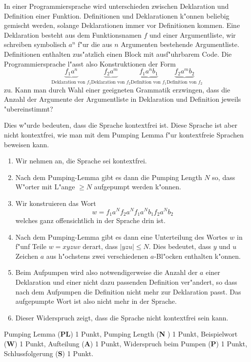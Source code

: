 In einer Programmiersprache wird unterschieden zwischen Deklaration
und Definition einer Funktion.
Definitionen und Deklarationen k"onnen beliebig gemischt werden,
solange Deklarationen immer vor Definitionen kommen.
Eine Deklaration besteht aus dem Funktionsnamen $f$ und einer Argumentliste,
wir schreiben symbolisch $a^n$  f"ur die aus $n$ Argumenten bestehende
Argumentliste.
Definitionen enthalten zus"atzlich einen Block mit ausf"uhrbarem Code.
Die Programmiersprache l"asst also Konstruktionen der Form
\[
\underbrace{f_1a^n}_{\text{Deklaration von $f_1$}}
\underbrace{f_2a^m}_{\text{Deklaration von $f_2$}}
\underbrace{f_1a^nb_1}_{\text{Definition von $f_1$}}
\underbrace{f_2a^m b_2}_{\text{Definition von $f_2$}}
\]
zu.
Kann man durch Wahl einer geeigneten Grammatik erzwingen, dass die
Anzahl der Argumente der Argumentliste in Deklaration und Definition
jeweils "ubereinstimmt?

\begin{loesung}
Dies w"urde bedeuten, dass die Sprache kontextfrei ist.
Diese Sprache ist aber nicht kontextfrei, wie man mit dem Pumping Lemma
f"ur kontextfreie Sprachen beweisen kann.
\begin{enumerate}
\item
Wir nehmen an, die Sprache sei kontextfrei.
\item
Nach dem Pumping-Lemma gibt es dann die Pumping Length $N$ so,
dass W"orter mit L"ange $\ge N$ aufgepumpt werden k"onnen.
\item
Wir konstruieren das Wort
\[
w=f_1a^N f_2a^N f_1a^Nb_1f_2a^Nb_2
\]
welches ganz offensichtlich in der Sprache drin ist.
\item
Nach dem Pumping-Lemma gibt es dann eine Unterteilung des Wortes $w$ in
f"unf Teile $w=xyzuv$ derart, dass $|yzu|\le N$.
Dies bedeutet, dass $y$ und $u$ Zeichen $a$ aus h"ochstens zwei verschiedenen
$a$-Bl"ocken enthalten k"onnen.
\item
Beim Aufpumpen wird also notwendigerweise die Anzahl der $a$ einer
Deklaration und einer nicht dazu passenden Definition ver"andert,
so dass nach dem Aufpumpen die Definition nicht mehr zur Deklaration 
passt.
Das aufgepumpte Wort ist also nicht mehr in der Sprache.
\item
Dieser Widerspruch zeigt, dass die Sprache nicht kontextfrei sein kann.
\qedhere
\end{enumerate}
\end{loesung}

\begin{bewertung}
Pumping Lemma ({\bf PL}) 1 Punkt,
Pumping Length ({\bf N }) 1 Punkt,
Beispielwort ({\bf W}) 1 Punkt,
Aufteilung ({\bf A}) 1 Punkt,
Widerspruch beim Pumpen ({\bf P}) 1 Punkt,
Schlussfolgerung ({\bf S}) 1 Punkt.
\end{bewertung}

